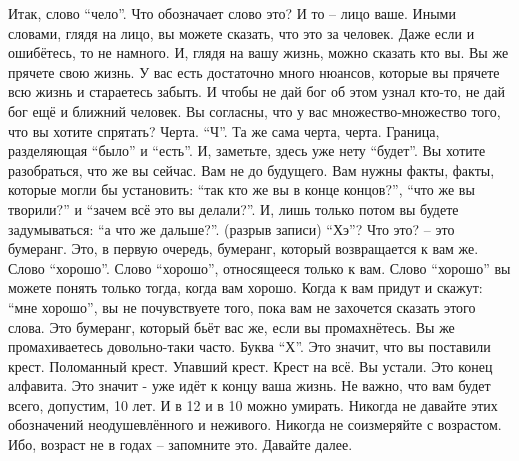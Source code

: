   Итак, слово ``чело''. Что обозначает слово это? И то – лицо ваше. Иными словами, глядя на лицо, вы можете сказать, что это за человек. Даже если и ошибётесь, то не намного. И, глядя на вашу жизнь, можно сказать кто вы. Вы же прячете свою жизнь. У вас есть достаточно много нюансов, которые вы прячете всю жизнь и стараетесь забыть. И чтобы не дай бог об этом узнал кто-то, не дай бог ещё и ближний человек. Вы согласны, что у вас множество-множество того, что вы хотите спрятать? Черта. ``Ч''. Та же сама черта, черта. Граница, разделяющая ``было'' и ``есть''. И, заметьте, здесь уже нету ``будет''. Вы хотите разобраться, что же вы сейчас. Вам не до будущего. Вам нужны факты, факты, которые могли бы установить: ``так кто же вы в конце концов?'', ``что же вы творили?'' и ``зачем всё это вы делали?''. И, лишь только потом вы будете задумываться: ``а что же дальше?''.
  (разрыв записи)
  ``Хэ''? Что это? – это бумеранг. Это, в первую очередь, бумеранг, который возвращается к вам же. Слово ``хорошо''. Слово ``хорошо'', относящееся только к вам. Слово ``хорошо'' вы можете понять только тогда, когда вам хорошо. Когда к вам придут и скажут: ``мне хорошо'', вы не почувствуете того, пока вам не захочется сказать этого слова. Это бумеранг, который бьёт вас же, если вы промахнётесь. Вы же промахиваетесь довольно-таки часто. 
  Буква ``Х''.  Это значит, что вы поставили крест. Поломанный крест. Упавший крест. Крест на всё. Вы устали. Это конец алфавита. Это значит - уже идёт к концу ваша жизнь. Не важно, что вам будет всего, допустим, 10 лет. И в 12 и в 10 можно умирать. Никогда не давайте этих обозначений неодушевлённого и неживого. Никогда не соизмеряйте с возрастом. Ибо, возраст не в годах – запомните это. Давайте далее.
